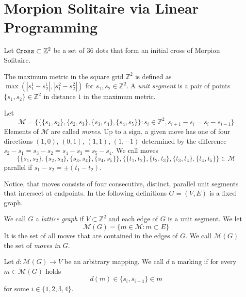 \section{Morpion Solitaire via Linear Programming}
\label{sec:linear}

  Let $\texttt{Cross} \subset \mathbb{Z}^2$ be a set of $36$ dots that form an initial cross of Morpion Solitaire.
\begin{definition}
The maximum metric in the square grid $\mathbb{Z}^2$ is defined as $\max (|s_1^1-s_2^1|,|s_1^2-s_2^2|)$
for $s_1,s_2\in \mathbb{Z}^2$. 
A \emph{unit segment} is a pair of points $\{s_1,s_2\}\in \mathbb{Z}^2$ in distance $1$ in the maximum metric. %
\end{definition}


\begin{definition} Let 
    \[
      \mathcal{M} = \{ \{ \{s_1, s_2\}, \{s_2, s_3\}, \{s_3, s_4\}, \{s_4, s_5\} \} \colon s_i \in \mathbb{Z}^2, s_{i+1} - s_i = s_i - s_{i-1} \}
    \]
    Elements of $\mathcal{M}$ are called \emph{moves}. Up to a sign, a given move has one of four directions $(1,0)$, $(0,1)$, $(1,1)$, $(1,-1)$ determined by
the difference $s_{2} - s_1 = s_3 - s_2 = s_4 - s_3 = s_5 - s_4$. 
We call moves \[ \{ \{s_1, s_2\}, \{s_2, s_3\}, \{s_3, s_4\}, \{s_4, s_5\} \}, \{ \{t_1, t_2\}, \{t_2, t_3\}, \{t_3, t_4\}, \{t_4, t_5\} \}\in \mathcal{M}\]
parallel if $s_1-s_2 = \pm (t_1-t_2)$.  
\end{definition}

Notice, that moves consists of four consecutive, distinct, parallel unit segments that intersect at endpoints. In the following 
definitions  $G = (V, E)$ is a fixed graph.
\begin{definition} 
We call $G$  a \emph{lattice graph} if $V \subset \mathbb{Z}^2$
      and each edge of $G$ is a unit segment.
    We let
    \[
      \mathcal{M}(G) = \{ m \in \mathcal{M} \colon m \subset E \}
    \]
    It is the set of all moves that are contained in the edges of $G$. We call $\mathcal{M}(G)$ the set of \emph{moves in $G$}.
    \item Let $d \colon \mathcal{M}(G) \to V$ be an arbitrary mapping. We call $d$ a marking if for every $m\in \mathcal{M}(G)$ holds
      \[
      	d(m) \in \{s_i, s_{i+1}\} \in m
      \]
    for some $i\in \{1,2,3,4\}$.
\end{definition}

